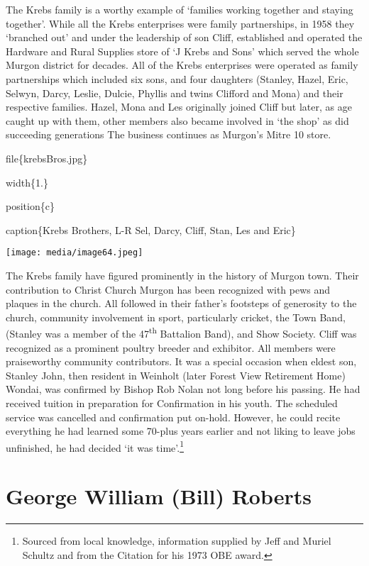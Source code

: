 The Krebs family is a worthy example of `families working together and staying together'. While all the Krebs enterprises were family partnerships, in 1958 they `branched out' and under the leadership of son Cliff, established and operated the Hardware and Rural Supplies store of `J Krebs and Sons' which served the whole Murgon district for decades. All of the Krebs enterprises were operated as family partnerships which included six sons, and four daughters (Stanley, Hazel, Eric, Selwyn, Darcy, Leslie, Dulcie, Phyllis and twins Clifford and Mona) and their respective families. Hazel, Mona and Les originally joined Cliff but later, as age caught up with them, other members also became involved in `the shop' as did succeeding generations The business continues as Murgon's Mitre 10 store.

file\{krebsBros.jpg\}

width\{1.\}

position\{c\}

caption\{Krebs Brothers, L-R Sel, Darcy, Cliff, Stan, Les and Eric\}

\texttt{[image: media/image64.jpeg]}

The Krebs family have figured prominently in the history of Murgon town. Their contribution to Christ Church Murgon has been recognized with pews and plaques in the church. All followed in their father's footsteps of generosity to the church, community involvement in sport, particularly cricket, the Town Band, (Stanley was a member of the 47\textsuperscript{th} Battalion Band), and Show Society. Cliff was recognized as a prominent poultry breeder and exhibitor. All members were praiseworthy community contributors. It was a special occasion when eldest son, Stanley John, then resident in Weinholt (later Forest View Retirement Home) Wondai, was confirmed by Bishop Rob Nolan not long before his passing. He had received tuition in preparation for Confirmation in his youth. The scheduled service was cancelled and confirmation put on-hold. However, he could recite everything he had learned some 70-plus years earlier and not liking to leave jobs unfinished, he had decided `it was time'.\footnote{Sourced from local knowledge, information supplied by Jeff and Muriel Schultz and from the Citation for his 1973 OBE award.}

\hypertarget{george-william-bill-roberts}{%
\section{George William (Bill) Roberts}\label{george-william-bill-roberts}}

